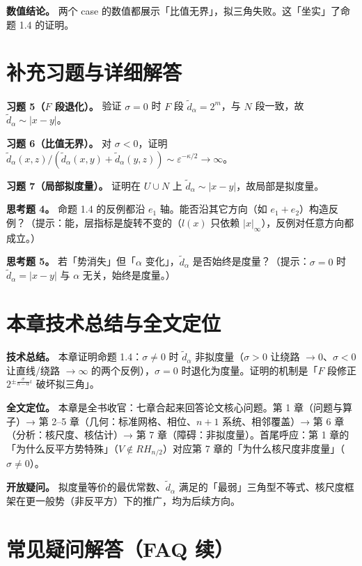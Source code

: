 \documentclass[a4paper,11pt,openany]{ctexbook}
\numberwithin{equation}{chapter}
\numberwithin{figure}{chapter}
\numberwithin{table}{chapter}
\begin{document}
\textbf{数值结论。} 两个 case 的数值都展示「比值无界」，拟三角失败。这「坐实」了命题 1.4 的证明。

\section{补充习题与详细解答}

\textbf{习题 5（$F$ 段退化）。} 验证 $\sigma=0$ 时 $F$ 段 $\widetilde d_\alpha=2^m$，与 $N$ 段一致，故 $\widetilde d_\alpha\sim|x-y|$。

\textbf{习题 6（比值无界）。} 对 $\sigma<0$，证明 $\widetilde d_\alpha(x,z)/(\widetilde d_\alpha(x,y)+\widetilde d_\alpha(y,z))\sim\varepsilon^{-\kappa/2}\to\infty$。

\textbf{习题 7（局部拟度量）。} 证明在 $U\cup N$ 上 $\widetilde d_\alpha\sim|x-y|$，故局部是拟度量。

\textbf{思考题 4。} 命题 1.4 的反例都沿 $e_1$ 轴。能否沿其它方向（如 $e_1+e_2$）构造反例？（提示：能，层指标是旋转不变的（$l(x)$ 只依赖 $|x|_\infty$），反例对任意方向都成立。）

\textbf{思考题 5。} 若「势消失」但「$\alpha$ 变化」，$\widetilde d_\alpha$ 是否始终是度量？（提示：$\sigma=0$ 时 $\widetilde d_\alpha=|x-y|$ 与 $\alpha$ 无关，始终是度量。）

\section{本章技术总结与全文定位}

\textbf{技术总结。} 本章证明命题 1.4：$\sigma\neq0$ 时 $\widetilde d_\alpha$ 非拟度量（$\sigma>0$ 让绕路 $\to0$、$\sigma<0$ 让直线/绕路 $\to\infty$ 的两个反例），$\sigma=0$ 时退化为度量。证明的机制是「$F$ 段修正 $2^{\pm\frac{\sigma}{n-\alpha}\iota}$ 破坏拟三角」。

\textbf{全文定位。} 本章是全书收官：七章合起来回答论文核心问题。第 1 章（问题与算子）→ 第 2–5 章（几何：标准网格、相位、$n+1$ 系统、相邻覆盖）→ 第 6 章（分析：核尺度、核估计）→ 第 7 章（障碍：非拟度量）。首尾呼应：第 1 章的「为什么反平方势特殊」（$V\notin RH_{n/2}$）对应第 7 章的「为什么核尺度非度量」（$\sigma\neq0$）。

\textbf{开放疑问。} 拟度量等价的最优常数、$\widetilde d_\alpha$ 满足的「最弱」三角型不等式、核尺度框架在更一般势（非反平方）下的推广，均为后续方向。

\section{常见疑问解答（FAQ 续）}
\end{document}
